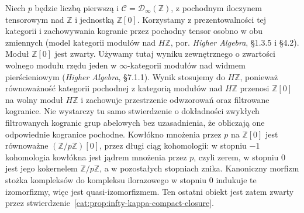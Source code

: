 \begin{przyklad}\label{cat:ex:infty-bousfield-prime-inversion}
Niech $p$ będzie liczbą pierwszą i $\mathcal C=\mathcal D_\infty(\mathbb Z)$, z pochodnym iloczynem tensorowym nad $\mathbb Z$ i jednostką $\mathbb Z[0]$. Korzystamy z prezentowalności tej kategorii i zachowywania kogranic przez pochodny tensor osobno w obu zmiennych (model kategorii modułów nad $H\mathbb Z$, por. \emph{Higher Algebra}, \S1.3.5 i \S4.2). Moduł $\mathbb Z[0]$ jest zwarty. Używamy tutaj wyniku zewnętrznego o zwartości wolnego modułu rzędu jeden w $\infty$-kategorii modułów nad widmem pierścieniowym (\emph{Higher Algebra}, \S7.1.1). Wynik stosujemy do $H\mathbb Z$, ponieważ równoważność kategorii pochodnej z kategorią modułów nad $H\mathbb Z$ przenosi $\mathbb Z[0]$ na wolny moduł $H\mathbb Z$ i zachowuje przestrzenie odwzorowań oraz filtrowane kogranice. Nie wystarczy tu samo stwierdzenie o dokładności zwykłych filtrowanych kogranic grup abelowych bez uzasadnienia, że obliczają one odpowiednie kogranice pochodne. Kowłókno mnożenia przez $p$ na $\mathbb Z[0]$ jest równoważne $(\mathbb Z/p\mathbb Z)[0]$, przez długi ciąg kohomologii: w stopniu $-1$ kohomologia kowłókna jest jądrem mnożenia przez $p$, czyli zerem, w stopniu $0$ jest jego kokernelem $\mathbb Z/p\mathbb Z$, a w pozostałych stopniach znika. Kanoniczny morfizm stożka kompleksów do kompleksu ilorazowego w stopniu $0$ indukuje te izomorfizmy, więc jest quasi-izomorfizmem. Ten ostatni obiekt jest zatem zwarty przez stwierdzenie~\ref{cat:prop:infty-kappa-compact-closure}.


\end{przyklad}
